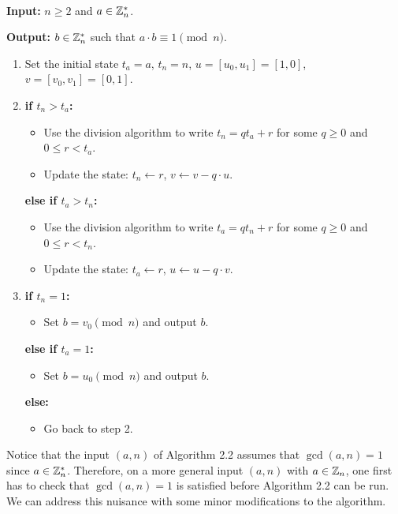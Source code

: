 \newpage 
\begin{algo}~

{\bf Input:} $n \geq 2$ and $a \in \mathbb{Z}_n^*$.

{\bf Output:} $b \in \mathbb{Z}_n^*$ such that $a \cdot b \equiv 1 \pmod n$. 
\begin{enumerate}
    \item Set the initial state $t_a = a$, $t_n = n$, $u = [u_0, u_1] = [1, 0]$, $v = [v_0, v_1] = [0, 1]$. 
    \item {\bf if $t_n > t_a$:}
    \begin{itemize}
        \item Use the division algorithm to write $t_n = qt_a + r$ for some 
        $q \geq 0$ and $0 \leq r < t_a$.
        \item Update the state: $t_n \gets r$, $v \gets v - q \cdot u$.
    \end{itemize}
    {\bf else if $t_a > t_n$:}
    \begin{itemize}
        \item Use the division algorithm to write $t_a = qt_n + r$ for some 
        $q \geq 0$ and $0 \leq r < t_n$.
        \item Update the state: $t_a \gets r$, $u \gets u - q \cdot v$. 
    \end{itemize}
    \item {\bf if $t_n = 1$:}
    \begin{itemize}
        \item Set $b = v_0 \pmod n$ and output $b$.
    \end{itemize}
    {\bf else if $t_a = 1$:} 
    \begin{itemize}
        \item Set $b = u_0 \pmod n$ and output $b$.
    \end{itemize}
    {\bf else:}
    \begin{itemize}
        \item Go back to step 2. 
    \end{itemize}
\end{enumerate}
\end{algo}

Notice that the input $(a, n)$ of Algorithm 2.2 assumes that $\gcd(a, n) = 1$ since $a \in \mathbb{Z}_n^*$. 
Therefore, on a more general input $(a, n)$ with $a \in \mathbb{Z}_n$, one first has to check that 
$\gcd(a, n) = 1$ is satisfied before Algorithm 2.2 can be run. We can address this nuisance with 
some minor modifications to the algorithm.

